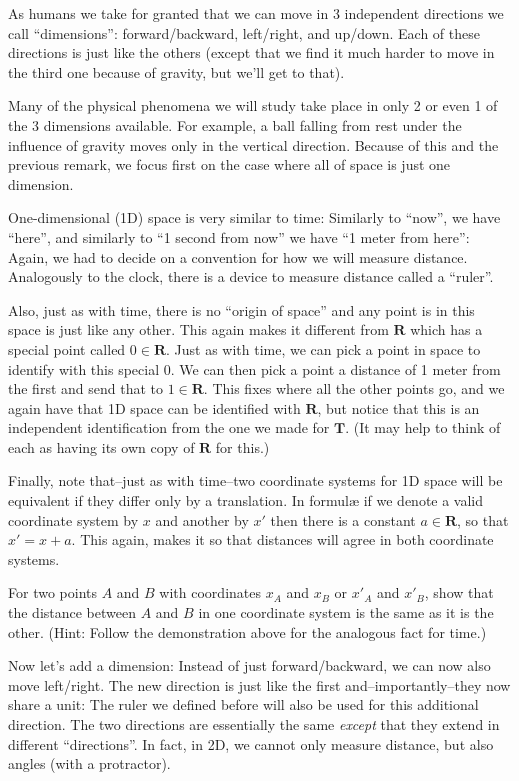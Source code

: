As humans we take for granted that we can move in 3 independent directions we call “dimensions”: forward/backward, left/right, and up/down. Each of these directions is just like the others (except that we find it much harder to move in the third one because of gravity, but we'll get to that). 

Many of the physical phenomena we will study take place in only 2 or even 1 of the 3 dimensions available. For example, a ball falling from rest under the influence of gravity moves only in the vertical direction. 
Because of this and the previous remark, we focus first on the case where all of space is just one dimension. 

One-dimensional (1D) space is very similar to time: 
Similarly to “now”, we have “here”, and similarly to “1 second from now” we have “1 meter from here”: Again, we had to decide on a convention for how we will measure distance. Analogously to the clock, there is a device to measure distance called a “ruler”. 

Also, just as with time, there is no “origin of space” and any point is in this space is just like any other. This again makes it different from $𝐑$ which has a special point called $0∈ 𝐑$. 
Just as with time, we can pick a point in space to identify with this special $0$. We can then pick a point a distance of 1 meter from the first and send that to $1∈𝐑$. This fixes where all the other points go, and we again have that 1D space can be identified with $𝐑$, but notice that this is an independent identification from the one we made for $𝐓$. (It may help to think of each as having its own copy of $𝐑$ for this.)

Finally, note that--just as with time--two coordinate systems for 1D space will be equivalent if they differ only by a translation. In formul\ae{} if we denote a valid coordinate system by $x$ and another by $x'$ then there is a constant $a∈𝐑$, so that $x' = x+a$. This again, makes it so that distances will agree in both coordinate systems.
\begin{exercise} 
For two points $A$ and $B$ with coordinates $x_A$ and $x_B$ or $x'_A$ and $x'_B$, show that the distance between $A$ and $B$ in one coordinate system is the same as it is the other.
(Hint: Follow the demonstration above for the analogous fact for time.)
\end{exercise}

Now let's add a dimension: Instead of just forward/backward, we can now also move left/right. The new direction is just like the first and--importantly--they now share a unit: The ruler we defined before will also be used for this additional direction. The two directions are essentially the same {\em except} that they extend in different “directions”. In fact, in 2D, we cannot only measure distance, but also angles (with a protractor). 

